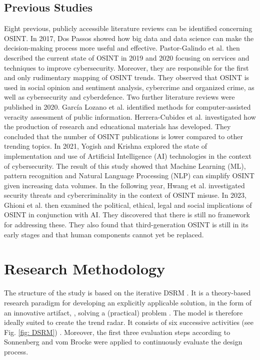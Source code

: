 \documentclass[10pt]{article}
\begin{document}
\subsection{Previous Studies}

Eight previous, publicly accessible literature reviews can be identified
concerning OSINT. In 2017, Dos Passos \cite{DosPassos.2017} showed how big data and data science can
make the decision-making process more useful and effective. Pastor-Galindo et al. then described
the current state of OSINT in 2019 \cite{PastorGalindo.2019} and 2020 \cite{PastorGalindo.2020}
focusing on services and techniques to improve cybersecurity. Moreover, they are responsible
for the first and only rudimentary mapping of OSINT trends. They observed that OSINT is used in
social opinion and sentiment analysis, cybercrime and organized crime, as well as cybersecurity and cyberdefence.
Two further literature reviews were published in 2020. García Lozano et al. \cite{GarciaLozano.2020} identified
methods for computer-assisted veracity assessment of public information.
Herrera-Cubides et al. \cite{HerreraCubides.2020} investigated how the production of
research and educational materials has developed. They concluded that
the number of OSINT publications is lower compared to other trending topics. In 2021,
Yogish and Krishna \cite{Yogish.2021} explored the state of implementation and use of
Artificial Intelligence (AI) technologies in the context of cybersecurity. The result of this
study showed that Machine Learning (ML), pattern recognition and Natural Language Processing
(NLP) can simplify OSINT given increasing data volumes. In the following year, Hwang et al.
\cite{Hwang.2022} investigated security threats and cybercriminality in the context of OSINT misuse.
In 2023, Ghioni et al. \cite{Ghioni.2023} then examined the political, ethical, legal and social implications of
OSINT in conjunction with AI. They discovered that there is still no framework
for addressing these. They also found that third-generation OSINT is still in its early
stages and that human components cannot yet be replaced.

\section{Research Methodology}

The structure of the study is based on the iterative DSRM \cite{Peffers.2007}. It is a theory-based
research paradigm for developing an explicitly applicable solution, in the form of an innovative artifact,
\cite{vomBrocke.2020b}, solving a (practical) problem \cite{Peffers.2007,Hevner.2004}. The model is therefore ideally suited to
create the trend radar. It consists of six successive activities (see Fig. \ref{fig: DSRM}) \cite{Peffers.2007}.
Moreover, the first three evaluation steps according to Sonnenberg and vom Brocke \cite{Sonnenberg.2012}
were applied to continuously evaluate the design process.
\end{document}

